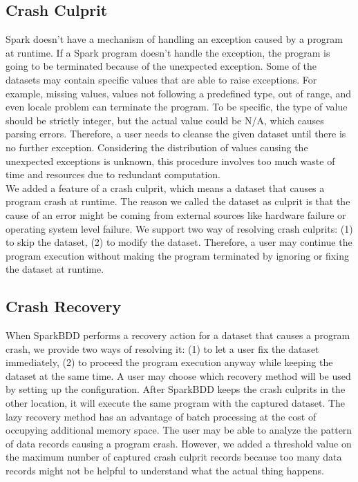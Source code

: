 \documentclass{acm_proc_article-sp}
\begin{document}
\subsection{Crash Culprit}

Spark doesn't have a mechanism of handling an exception caused by a program at runtime. If a Spark program doesn't handle the exception, the program is going to be terminated because of the unexpected exception. Some of the datasets may contain specific values that are able to raise exceptions. For example, missing values, values not following a predefined type, out of range, and even locale problem can terminate the program. To be specific, the type of value should be strictly integer, but the actual value could be N/A, which causes parsing errors. Therefore, a user needs to cleanse the given dataset until there is no further exception. Considering the distribution of values causing the unexpected exceptions is unknown, this procedure involves too much waste of time and resources due to redundant computation.\\
We added a feature of a crash culprit, which means a dataset that causes a program crash at runtime. The reason we called the dataset as culprit is that the cause of an error might be coming from external sources like hardware failure or operating system level failure. We support two way of resolving crash culprits: (1) to skip the dataset, (2) to modify the dataset. Therefore, a user may continue the program execution without making the program terminated by ignoring or fixing the dataset at runtime.

\subsection{Crash Recovery}

When SparkBDD performs a recovery action for a dataset that causes a program crash, we provide two ways of resolving it: (1) to let a user fix the dataset immediately, (2) to proceed the program execution anyway while keeping the dataset at the same time. A user may choose which recovery method will be used by setting up the configuration. After SparkBDD keeps the crash culprits in the other location, it will execute the same program with the captured dataset. The lazy recovery method has an advantage of batch processing at the cost of occupying additional memory space. The user may be able to analyze the pattern of data records causing a program crash. However, we added a threshold value on the maximum number of captured crash culprit records because too many data records might not be helpful to understand what the actual thing happens.
\end{document}
